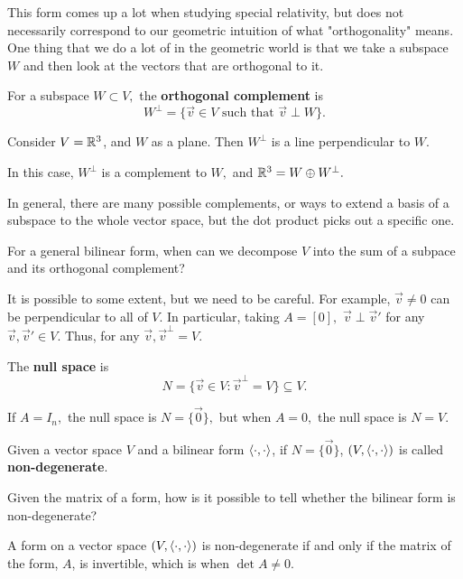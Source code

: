 This form comes up a lot when studying special relativity, but does not necessarily correspond to our geometric intuition of what "orthogonality" means.
One thing that we do a lot of in the geometric world is that we take a subspace $W$ and then look at the vectors that are orthogonal to it. 
\begin{definition}
For a subspace $W \subset V,$ the \textbf{orthogonal complement} is 
\[
W^{\perp} = \{\vec{v} \in V \text{ such that } \vec{v} \perp W\}.
\]
\end{definition}

\begin{example}
Consider $V= \mathbb R^3$, and $W$ as a plane. Then $W^\perp$ is a line perpendicular to $W$. 

In this case, $W^{\perp}$ is a complement to $W,$ and $\mathbb R^3 = W \oplus W^{\perp}.$
\end{example}

In general, there are many possible complements, or ways to extend a basis of a subspace to the whole vector space, but the dot product picks out a specific one. 

\begin{qq}
For a general bilinear form, when can we decompose $V$ into the sum of a subpace and its orthogonal complement?
\end{qq}

It is possible to some extent, but we need to be careful. For example, $\vec{v} \neq 0$ can be perpendicular to all of $V.$ In particular, taking $A = [0],$ $\vec{v} \perp \vec{v}'$ for any $\vec{v}, \vec{v}' \in V.$ Thus, for any $\vec{v}, \vec{v}^{\perp} = V.$
\begin{definition}
The \textbf{null space} is 
\[
N = \{\vec{v} \in V: \vec{v}^{\perp} = V\} \subseteq V.
\]
\end{definition}

If $A = I_n,$ the null space is $N = \{\vec{0}\},$ but when $A = 0,$ the null space is $N = V.$


\begin{definition}
Given a vector space $V$ and  a bilinear form $\langle \cdot, \cdot \rangle$, if $N = \{\vec{0}\}$, $(V, \langle \cdot, \cdot \rangle)$ is called \textbf{non-degenerate}.
\end{definition}

Given the matrix of a form, how is it possible to tell whether the bilinear form is non-degenerate?
\begin{proposition}
A form on a vector space $(V, \langle \cdot, \cdot \rangle)$ is non-degenerate if and only if the matrix of the form, $A$, is invertible, which is when $\det A  \neq 0.$
\end{proposition}

